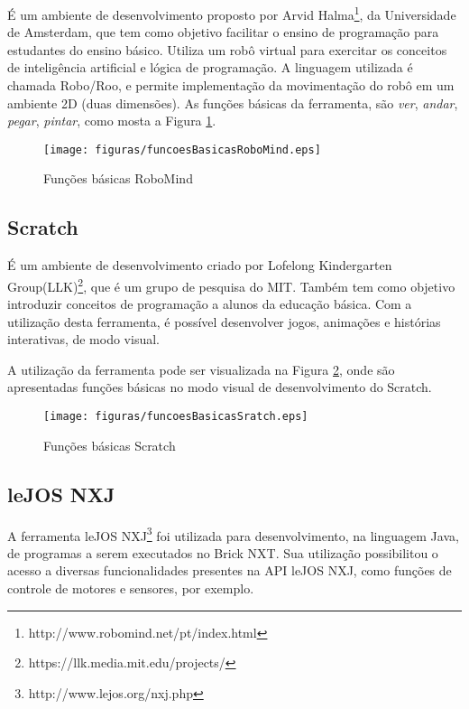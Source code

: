 		É um ambiente de desenvolvimento proposto por Arvid Halma\footnote{http://www.robomind.net/pt/index.html}, da Universidade de Amsterdam, que tem como objetivo facilitar o ensino de programação para estudantes do ensino básico. Utiliza um robô virtual para exercitar os conceitos de inteligência artificial e lógica de programação. A linguagem utilizada é chamada Robo/Roo, e permite implementação da movimentação do robô em um ambiente 2D (duas dimensões). As funções básicas da ferramenta, são \textit{ver}, \textit{andar}, \textit{pegar}, \textit{pintar}, como mosta a Figura \ref{img:funcoesBasicasRoboMind}.

		\begin{figure}[H]
			\centering
			\texttt{[image: figuras/funcoesBasicasRoboMind.eps]}
			\caption[Funções básicas RoboMind]{Funções básicas RoboMind}
			\label{img:funcoesBasicasRoboMind}
		\end{figure}
	

	\subsection{Scratch} %
	\label{sub:scratch}

		É um ambiente de desenvolvimento criado por Lofelong Kindergarten Group(LLK)\footnote{https://llk.media.mit.edu/projects/}, que é um grupo de pesquisa do MIT. Também tem como objetivo introduzir conceitos de programação a alunos da educação básica. Com a utilização desta ferramenta, é possível desenvolver jogos, animações e histórias interativas, de modo visual.

		A utilização da ferramenta pode ser visualizada na Figura \ref{img:funcoesBasicasScratch}, onde são apresentadas funções básicas no modo visual de desenvolvimento do Scratch.

		\begin{figure}[H]
			\centering
			\texttt{[image: figuras/funcoesBasicasSratch.eps]}
			\caption[Funções básicas Scratch]{Funções básicas Scratch}
			\label{img:funcoesBasicasScratch}
		\end{figure}

	\subsection{leJOS NXJ} %
	\label{sub:lejos_nxj}
		A ferramenta leJOS NXJ\footnote{http://www.lejos.org/nxj.php} foi utilizada para desenvolvimento, na linguagem Java, de programas a serem executados no Brick NXT. Sua utilização possibilitou o acesso a diversas funcionalidades presentes na API leJOS NXJ, como funções de controle de motores e sensores, por exemplo.

